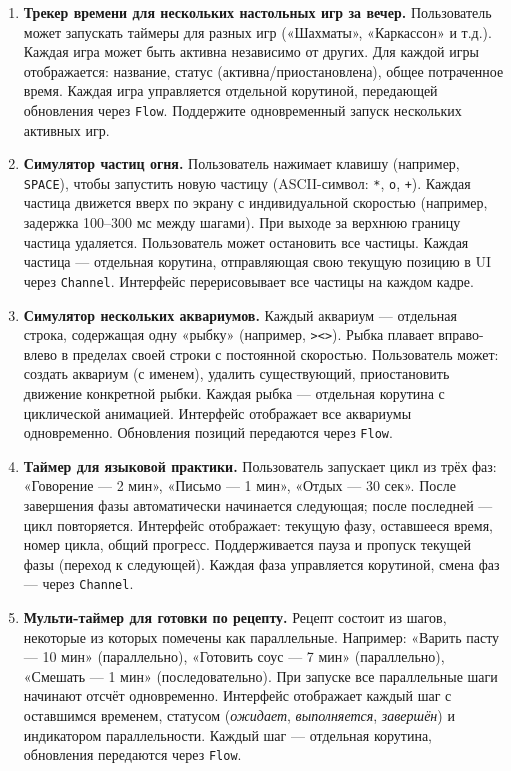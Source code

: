 \begin{enumerate}
\item[10]
\textbf{Трекер времени для нескольких настольных игр за вечер.} Пользователь может запускать таймеры для разных игр («Шахматы», «Каркассон» и т.д.). Каждая игра может быть активна независимо от других. Для каждой игры отображается: название, статус (активна/приостановлена), общее потраченное время. Каждая игра управляется отдельной корутиной, передающей обновления через \texttt{Flow}. Поддержите одновременный запуск нескольких активных игр.

\item[11]
\textbf{Симулятор частиц огня.} Пользователь нажимает клавишу (например, \texttt{SPACE}), чтобы запустить новую частицу (ASCII-символ: \texttt{*}, \texttt{o}, \texttt{+}). Каждая частица движется вверх по экрану с индивидуальной скоростью (например, задержка 100–300 мс между шагами). При выходе за верхнюю границу частица удаляется. Пользователь может остановить все частицы. Каждая частица — отдельная корутина, отправляющая свою текущую позицию в UI через \texttt{Channel}. Интерфейс перерисовывает все частицы на каждом кадре.

\item[12]
\textbf{Симулятор нескольких аквариумов.} Каждый аквариум — отдельная строка, содержащая одну «рыбку» (например, \texttt{><>}). Рыбка плавает вправо-влево в пределах своей строки с постоянной скоростью. Пользователь может: создать аквариум (с именем), удалить существующий, приостановить движение конкретной рыбки. Каждая рыбка — отдельная корутина с циклической анимацией. Интерфейс отображает все аквариумы одновременно. Обновления позиций передаются через \texttt{Flow}.

\item[13]
\textbf{Таймер для языковой практики.} Пользователь запускает цикл из трёх фаз: «Говорение — 2 мин», «Письмо — 1 мин», «Отдых — 30 сек». После завершения фазы автоматически начинается следующая; после последней — цикл повторяется. Интерфейс отображает: текущую фазу, оставшееся время, номер цикла, общий прогресс. Поддерживается пауза и пропуск текущей фазы (переход к следующей). Каждая фаза управляется корутиной, смена фаз — через \texttt{Channel}.

\item[14]
\textbf{Мульти-таймер для готовки по рецепту.} Рецепт состоит из шагов, некоторые из которых помечены как параллельные. Например: «Варить пасту — 10 мин» (параллельно), «Готовить соус — 7 мин» (параллельно), «Смешать — 1 мин» (последовательно). При запуске все параллельные шаги начинают отсчёт одновременно. Интерфейс отображает каждый шаг с оставшимся временем, статусом (\textit{ожидает}, \textit{выполняется}, \textit{завершён}) и индикатором параллельности. Каждый шаг — отдельная корутина, обновления передаются через \texttt{Flow}.


\end{enumerate}
